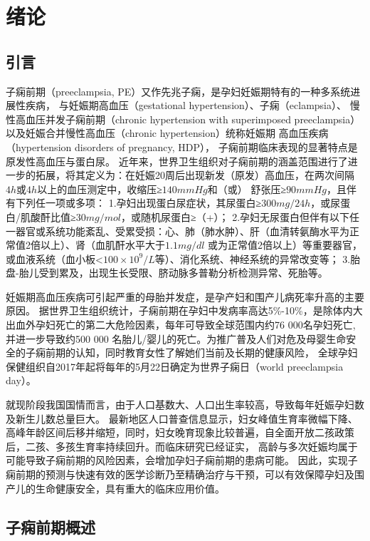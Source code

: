 \chapter{绪论}

\section{引言}
子痫前期（preeclampsia, PE）又作先兆子痫，是孕妇妊娠期特有的一种多系统进展性疾病， 与妊娠期高血压（gestational hypertension）、子痫（eclampsia）、
慢性高血压并发子痫前期（chronic hypertension with superimposed preeclampsia）以及妊娠合并慢性高血压（chronic hypertension）统称妊娠期
高血压疾病（hypertension disorders of pregnancy, HDP）\cite{OAG9,HDASOM,2000s1}，
子痫前期临床表现的显著特点是原发性高血压与蛋白尿。
近年来，世界卫生组织对子痫前期的涵盖范围进行了进一步的拓展，将其定义为：在妊娠20周后出现新发（原发）高血压，在两次间隔$4h$或$4h$以上的血压测定中，收缩压≥$140mmHg$和（或）
舒张压≥$90mmHg$，且伴有下列任一项或多项\cite{OAG9,FIGO}：
1.孕妇出现蛋白尿症状，其尿蛋白≥$300mg/24h$，或尿蛋白/肌酸酐比值≥$30mg/mol$，或随机尿蛋白≥（+）；
2.孕妇无尿蛋白但伴有以下任一器官或系统功能紊乱、受累受损：心、肺（肺水肿）、肝（血清转氨酶水平为正常值2倍以上）、肾（血肌酐水平大于$1.1mg/dl$
或为正常值2倍以上）等重要器官，或血液系统（血小板<$100 \times 10^{9}/L$等）、消化系统、神经系统的异常改变等；
3.胎盘-胎儿受到累及，出现生长受限、脐动脉多普勒分析检测异常、死胎等。

妊娠期高血压疾病可引起严重的母胎并发症，是孕产妇和围产儿病死率升高的主要原因\cite{OAG9}。
据世界卫生组织统计，子痫前期在孕妇中发病率高达5\%-10\%，是除体内大出血外孕妇死亡的第二大危险因素\cite{LCT2006}，每年可导致全球范围内约76 000名孕妇死亡,并进一步导致约500 000
名胎儿/婴儿的死亡\cite{DAM2015,LCT2006}。为推广普及人们对危及母婴生命安全的子痫前期的认知，同时教育女性了解她们当前及长期的健康风险，
全球孕妇保健组织自2017年起将每年的5月22日确定为世界子痫日（world preeclampsia day）。

就现阶段我国国情而言，由于人口基数大、人口出生率较高，导致每年妊娠孕妇数及新生儿数总量巨大\cite{nbs2022}。
最新地区人口普查信息显示\cite{zjtjj2022}，妇女峰值生育率微幅下降、高峰年龄区间后移并缩短，同时，妇女晚育现象比较普遍，自全面开放二孩政策后，二孩、多孩生育率持续回升。而临床研究已经证实，
高龄与多次妊娠均属于可能导致子痫前期的风险因素，会增加孕妇子痫前期的患病可能\cite{Duckitt2005,FIGO,Yogev2010,Poon2010,Lee2000,Coonrod1995,Robillard1993}。
因此，实现子痫前期的预测与快速有效的医学诊断乃至精确治疗与干预，可以有效保障孕妇及围产儿的生命健康安全，具有重大的临床应用价值。
\section{子痫前期概述}
